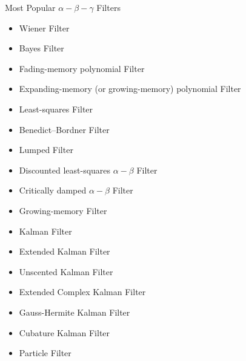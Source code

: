 \begin{frame}{Most Popular $\alpha-\beta-\gamma$ Filters}
\begin{itemize}
    \item Wiener Filter
    \item Bayes Filter
    \item Fading-memory polynomial Filter
    \item Expanding-memory (or growing-memory) polynomial Filter
    \item Least-squares Filter
    \item Benedict–Bordner Filter
    \item Lumped Filter
    \item Discounted least-squares $\alpha-\beta$ Filter
    \item Critically damped $\alpha-\beta$ Filter
    \item Growing-memory Filter
    \item Kalman Filter
    \item Extended Kalman Filter
    \item Unscented Kalman Filter
    \item Extended Complex Kalman Filter
    \item Gauss-Hermite Kalman Filter
    \item Cubature Kalman Filter
    \item Particle Filter
\end{itemize}

    
\end{frame}

